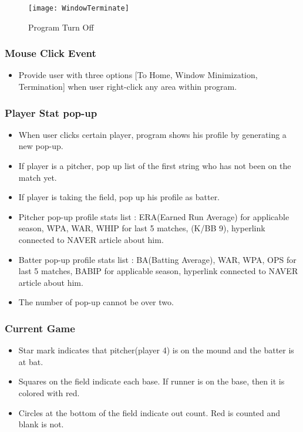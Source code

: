 \documentclass[conference,compsoc, twocolumn]{IEEEtran}
\begin{document}
\begin{figure}[H]
\centering\texttt{[image: WindowTerminate]}
\caption{Program Turn Off}
\end{figure}

\subsubsection{Mouse Click Event}
\begin{itemize}
\item Provide user with three options [To Home, Window Minimization, Termination] when user right-click any area within program.
\end{itemize}

\subsubsection{Player Stat pop-up}
\begin{itemize}
\item When user clicks certain player, program shows his profile by generating a new pop-up.
\item If player is a pitcher, pop up list of the first string who has not been on the match yet.
\item If player is taking the field, pop up his profile as batter.
\item Pitcher pop-up profile stats list : ERA(Earned Run Average) for applicable season, WPA, WAR, WHIP for last 5 matches, (K/BB 9), hyperlink connected to NAVER article about him.
\item Batter pop-up profile stats list : BA(Batting Average), WAR, WPA, OPS for last 5 matches, BABIP for applicable season, hyperlink connected to NAVER article about him.
\item The number of pop-up cannot be over two.
\end{itemize}


\subsubsection{Current Game}
\begin{itemize}
\item Star mark indicates that pitcher(player 4) is on the mound and the batter is at bat.
\item Squares on the field indicate each base. If runner is on the base, then it is colored with red.
\item Circles at the bottom of the field indicate out count. Red is counted and blank is not.
\end{itemize}
\end{document}
